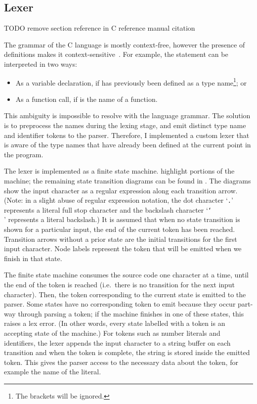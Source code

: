 \documentclass[00-main.tex]{subfiles}
\begin{document}
\subsection{Lexer}

\begin{mrwComment}
TODO remove section reference in C reference manual citation
\end{mrwComment}

The grammar of the C language is mostly context-free, however the presence of  definitions makes it context-sensitive~.
For example, the statement  can be interpreted in two ways:
\begin{itemize}
\item As a variable declaration, if  has previously been defined as a type name\footnote{The brackets will be ignored.}; or
\item As a function call, if  is the name of a function.
\end{itemize}

This ambiguity is impossible to resolve with the language grammar. The solution is to preprocess the  names during the lexing stage, and emit distinct type name and identifier tokens to the parser.
Therefore, I implemented a custom lexer that is aware of the type names that have already been defined at the current point in the program.

The lexer is implemented as a finite state machine.  highlight portions of the machine; the remaining state transition diagrams can be found in .
The diagrams show the input character as a regular expression along each transition arrow. (Note: in a slight abuse of regular expression notation, the dot character `\texttt{.}' represents a literal full stop character and the backslash character `\texttt{\char`\\}' represents a literal backslash.)
It is assumed that when no state transition is shown for a particular input, the end of the current token has been reached.
Transition arrows without a prior state are the initial transitions for the first input character.
Node labels represent the token that will be emitted when we finish in that state.

The finite state machine consumes the source code one character at a time, until the end of the token is reached (i.e.\ there is no transition for the next input character).
Then, the token corresponding to the current state is emitted to the parser.
Some states have no corresponding token to emit because they occur part-way through parsing a token; if the machine finishes in one of these states, this raises a lex error.
(In other words, every state labelled with a token is an accepting state of the machine.)
For tokens such as number literals and identifiers, the lexer appends the input character to a string buffer on each transition and when the token is complete, the string is stored inside the emitted token.
This gives the parser access to the necessary data about the token, for example the name of the literal.
\end{document}
